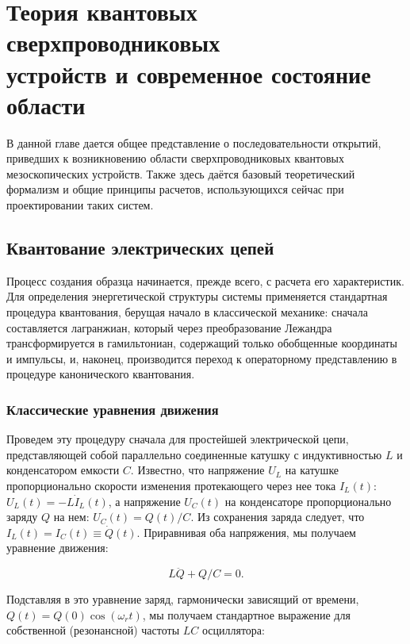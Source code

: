 \documentclass[14pt, a4paper]{extreport}
\numberwithin{equation}{section}
\begin{document}
\chapter{Теория квантовых сверхпроводниковых\\ устройств и современное состояние области}


В данной главе дается общее представление о последовательности открытий, приведших к возникновению области сверхпроводниковых квантовых мезоскопических устройств. Также здесь даётся базовый теоретический формализм и общие принципы расчетов, использующихся сейчас при проектировании таких систем. 

\section{Квантование электрических цепей}\label{sec:circuit_quantization}


Процесс создания образца начинается, прежде всего, с расчета его характеристик. Для определения энергетической структуры системы применяется стандартная процедура квантования, берущая начало в классической механике: сначала составляется лагранжиан, который через преобразование Лежандра трансформируется в гамильтониан, содержащий только обобщенные координаты и импульсы, и, наконец, производится переход к операторному представлению в процедуре канонического квантования. 

\subsection{Классические уравнения движения}


Проведем эту процедуру сначала для простейшей электрической цепи, представляющей собой параллельно соединенные катушку с индуктивностью $L$ и конденсатором емкости $C$. Известно, что напряжение $U_L$ на катушке пропорционально скорости изменения протекающего через нее тока $I_L(t)$: $U_L(t) = - L \dot I_L(t)$, а напряжение $U_C(t)$ на конденсаторе пропорционально заряду $Q$ на нем: $U_C(t) = Q(t)/C$. Из сохранения заряда следует, что $I_L(t) = I_C(t) \equiv \dot Q(t)$. Приравнивая оба напряжения, мы получаем уравнение движения:

\begin{equation}
L \ddot Q + Q/C = 0.
\end{equation}

Подставляя в это уравнение заряд, гармонически зависящий от времени, $Q(t) = Q(0) \cos(\omega_r t)$, мы получаем стандартное выражение для собственной (резонансной) частоты $LC$ осциллятора:
\end{document}
